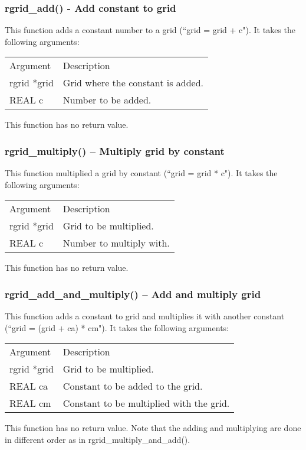 \documentclass[12pt,letterpaper]{article}
\begin{document}
\subsubsection{rgrid\_add() - Add constant to grid}

This function adds a constant number to a grid (``grid = grid + c"). It takes the following arguments:
\begin{longtable}{p{} p{}}
Argument & Description\\
\cline{1-2}
rgrid *grid & Grid where the constant is added.\\
REAL c & Number to be added.\\
\end{longtable}
\noindent
This function has no return value.

\subsubsection{rgrid\_multiply() -- Multiply grid by constant}

This function multiplied a grid by constant (``grid = grid * c"). It takes the following arguments:
\begin{longtable}{p{} p{}}
Argument & Description\\
\cline{1-2}
rgrid *grid & Grid to be multiplied.\\
REAL c & Number to multiply with.\\
\end{longtable}
\noindent
This function has no return value.

\subsubsection{rgrid\_add\_and\_multiply() -- Add and multiply grid}

This function adds a constant to grid and multiplies it with another constant (``grid = (grid + ca) * cm"). It takes the following arguments:
\begin{longtable}{p{} p{}}
Argument & Description\\
\cline{1-2}
rgrid *grid & Grid to be multiplied.\\
REAL ca & Constant to be added to the grid.\\
REAL cm & Constant to be multiplied with the grid.\\
\end{longtable}
\noindent
This function has no return value. Note that the adding and multiplying are done in different order as in rgrid\_multiply\_and\_add().
\end{document}

